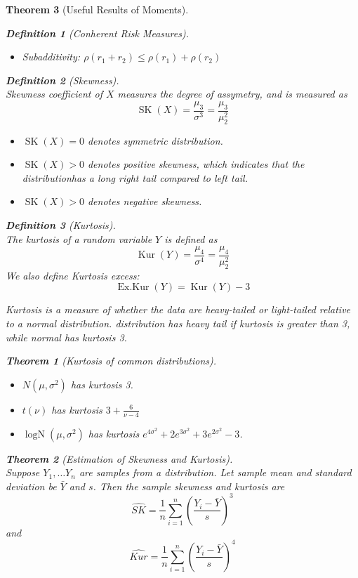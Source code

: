 \documentclass[12pt]{article}
\newtheorem{definition}{Definition}[section]
\newtheorem{theorem}{Theorem}[section]
\theoremstyle{definition}
\DeclareMathOperator{\LogN}{logN}
\DeclareMathOperator{\SK}{SK}
\DeclareMathOperator{\Kur}{Kur}
\DeclareMathOperator{\ExKur}{Ex.Kur}
\begin{document}
\begin{theorem}[Useful Results of Moments]
\begin{definition}[Conherent Risk Measures]
\begin{itemize}
  \item Subadditivity: $\rho(r_1+r_2)\leq \rho(r_1)+\rho(r_2)$
\end{itemize}
\end{definition}
\begin{definition}[Skewness]
\hfill\\\normalfont Skewness coefficient of $X$ measures the degree of assymetry, and is measured as
\[
\SK(X) = \frac{\mu_3}{\sigma^3} = \frac{\mu_3}{\mu_2^2}
\]
\begin{itemize}
  \item $\SK(X)=0$ denotes symmetric distribution.
  \item $\SK(X)>0$ denotes positive skewness, which indicates that the distributionhas a long right tail compared to left tail.
  \item $\SK(X)>0$ denotes negative skewness.
\end{itemize}
\end{definition}
\begin{definition}[Kurtosis]
\hfill\\\normalfont The kurtosis of a random variable $Y$ is defined as
\[
\Kur(Y) = \frac{\mu_4}{\sigma^4} =\frac{\mu_4}{\mu_2^2}
\]
We also define Kurtosis excess:
\[
\ExKur(Y) = \Kur(Y)-3
\]
\end{definition}
Kurtosis is a measure of whether the data are heavy-tailed or light-tailed relative to a normal distribution. distribution has heavy tail if kurtosis is greater than 3, while normal has kurtosis 3.
\begin{theorem}[Kurtosis of common distributions]
\hfill\\\normalfont
\begin{itemize}
  \item $N(\mu, \sigma^2)$ has kurtosis 3.
  \item $t(\nu)$ has kurtosis $3+\frac{6}{\nu -4}$
  \item $\LogN(\mu, \sigma^2)$ has kurtosis $e^{4\sigma^2}+2e^{3\sigma^2} + 3e^{2\sigma^2}-3$.
\end{itemize}
\end{theorem}
\begin{theorem}[Estimation of Skewness and Kurtosis]
\hfill\\\normalfont Suppose $Y_1, \ldots Y_n$ are samples from a distribution. Let sample mean and standard deviation be $\bar{Y}$ and $s$. Then the sample skewness and kurtosis are
\[
\hat{SK}=\frac{1}{n}\sum_{i=1}^n (\frac{Y_i-\bar{Y}}{s})^3
\]
and
\[
\hat{Kur}=\frac{1}{n}\sum_{i=1}^n(\frac{Y_i-\bar{Y}}{s})^4
\]
\end{theorem}
\end{theorem}
\end{document}
